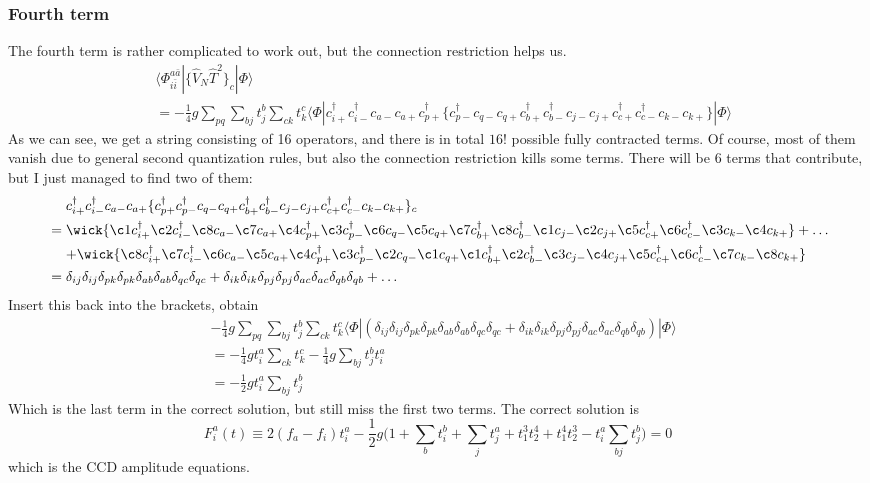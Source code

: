 \documentclass[norsk,a4paper,12pt]{article}
\begin{document}
\subsubsection*{Fourth term}
The fourth term is rather complicated to work out, but the connection restriction helps us.
\begin{align*}
&\langle\Phi_{i\bar{i}}^{a\bar{a}}|\{\hat{V}_N\hat{T}^2\}_c|\Phi\rangle\\
&=-\frac{1}{4}g\sum_{pq}\sum_{bj}t_j^b\sum_{ck}t_k^c\langle\Phi|c_{i+}^{\dagger}c_{i-}^{\dagger}c_{a-}c_{a+}c_{p+}^{\dagger}\{c_{p-}^{\dagger}c_{q-}c_{q+}c_{b+}^{\dagger}c_{b-}^{\dagger}c_{j-}c_{j+}c_{c+}^{\dagger}c_{c-}^{\dagger}c_{k-}c_{k+}\}|\Phi\rangle
\end{align*}
As we can see, we get a string consisting of 16 operators, and there is in total $16!$ possible fully contracted terms. Of course, most of them vanish due to general second quantization rules, but also the connection restriction kills some terms. There will be 6 terms that contribute, but I just managed to find two of them:
\begin{align*}
&\mathrel{\phantom{=}}c_{i+}^{\dagger}c_{i-}^{\dagger}c_{a-}c_{a+}\{c_{p+}^{\dagger}c_{p-}^{\dagger}c_{q-}c_{q+}c_{b+}^{\dagger}c_{b-}^{\dagger}c_{j-}c_{j+}c_{c+}^{\dagger}c_{c-}^{\dagger}c_{k-}c_{k+}\}_c\\
&=\wick{\c1 c_{i+}^{\dagger}\c2 c_{i-}^{\dagger}\c8 c_{a-}\c7 c_{a+}\c4 c_{p+}^{\dagger}\c3 c_{p-}^{\dagger}\c6 c_{q-}\c5 c_{q+}\c7 c_{b+}^{\dagger}\c8 c_{b-}^{\dagger}\c1 c_{j-}\c2 c_{j+}\c5 c_{c+}^{\dagger}\c6 c_{c-}^{\dagger}\c3 c_{k-}\c4 c_{k+}}+\hdots\\
&\mathrel{\phantom{=}}+\wick{\c8 c_{i+}^{\dagger}\c7 c_{i-}^{\dagger}\c6 c_{a-}\c5 c_{a+}\c4 c_{p+}^{\dagger}\c3 c_{p-}^{\dagger}\c2 c_{q-}\c1 c_{q+}\c1 c_{b+}^{\dagger}\c2 c_{b-}^{\dagger}\c3 c_{j-}\c4 c_{j+}\c5 c_{c+}^{\dagger}\c6 c_{c-}^{\dagger}\c7 c_{k-}\c8 c_{k+}}\\
&=\delta_{ij}\delta_{ij}\delta_{pk}\delta_{pk}\delta_{ab}\delta_{ab}\delta_{qc}\delta_{qc}+\delta_{ik}\delta_{ik}\delta_{pj}\delta_{pj}\delta_{ac}\delta_{ac}\delta_{qb}\delta_{qb}+\hdots
\end{align*}
Insert this back into the brackets, obtain
\begin{align*}
&-\frac{1}{4}g\sum_{pq}\sum_{bj}t_j^b\sum_{ck}t_k^c\langle\Phi|(\delta_{ij}\delta_{ij}\delta_{pk}\delta_{pk}\delta_{ab}\delta_{ab}\delta_{qc}\delta_{qc}+\delta_{ik}\delta_{ik}\delta_{pj}\delta_{pj}\delta_{ac}\delta_{ac}\delta_{qb}\delta_{qb})|\Phi\rangle\\
&=-\frac{1}{4}gt_i^a\sum_{ck}t_k^c-\frac{1}{4}g\sum_{bj}t_j^bt_i^a\\
&=-\frac{1}{2}gt_i^a\sum_{bj}t_j^b
\end{align*}
Which is the last term in the correct solution, but still miss the first two terms. The correct solution is
\begin{equation}
F_i^a(t)\equiv2(f_a-f_i)t_i^a-\frac{1}{2}g\bigg(1+\sum_bt_i^b+\sum_jt_j^a+t_1^3t_2^4+t_1^4t_2^3-t_i^a\sum_{bj}t_j^b\bigg)=0
\label{eq:amplitudes}
\end{equation}
which is the CCD amplitude equations. 
\end{document}
